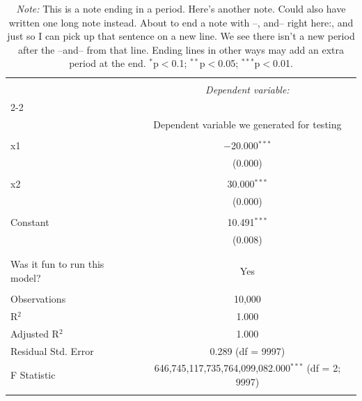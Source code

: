\begin{table}[!h] \centering 
  \caption{A table! With exclamation marks in the title!} 
  \label{model_output_label_for_crossref}
  \footnotesize
\begin{tabular}{@{\extracolsep{5pt}}lc} 
\\[-1.8ex]\hline 
\hline \\[-1.8ex] 
 & \multicolumn{1}{c}{\textit{Dependent variable:}} \\ 
\cline{2-2} 
\\[-1.8ex] & Dependent variable we generated for testing \\ 
\hline \\[-1.8ex] 
 x1 & $-$20.000$^{***}$ \\ 
  & (0.000) \\ 
  & \\ 
 x2 & 30.000$^{***}$ \\ 
  & (0.000) \\ 
  & \\ 
 Constant & 10.491$^{***}$ \\ 
  & (0.008) \\ 
  & \\ 
\hline \\[-1.8ex] 
Was it fun to run this model? & Yes \\ 
\hline \\[-1.8ex] 
Observations & 10,000 \\ 
R$^{2}$ & 1.000 \\ 
Adjusted R$^{2}$ & 1.000 \\ 
Residual Std. Error & 0.289 (df = 9997) \\ 
F Statistic & 646,745,117,735,764,099,082.000$^{***}$ (df = 2; 9997) \\ 
\hline 
\hline \\[-1.8ex] 
\end{tabular} \\
\footnotesize
\caption*{\footnotesize \centering \textit{Note:} This is a note ending in a period. Here's another note. Could also have written one long note instead. About to end a note with --, and-- right here:, and just so I can pick up that sentence on a new line. We see there isn't a new period after the --and-- from that line. Ending lines in other ways may add an extra period at the end. $^{*}$p$<$0.1; $^{**}$p$<$0.05; $^{***}$p$<$0.01.}
\end{table} 
